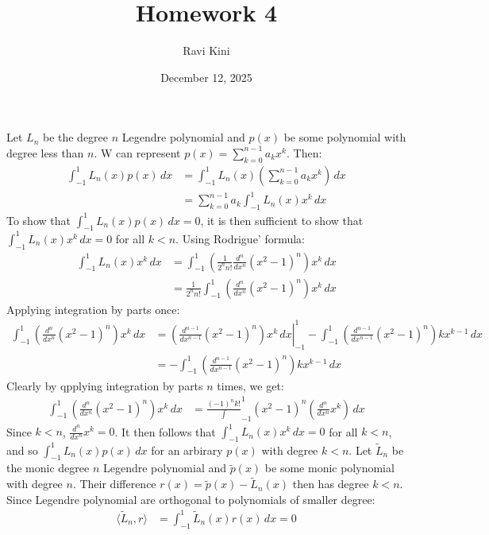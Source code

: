 \documentclass{article}
\title{Homework 4}
\author{Ravi Kini}
\date{December 12, 2025}
\begin{document}
\maketitle

\problem{}
Let $L_n$ be the degree $n$ Legendre polynomial and $p(x)$ be some polynomial with degree less than $n$. W can represent $p(x) = \sum_{k=0}^{n-1} a_k x^k$. Then:
\begin{align*}
    \int_{-1}^1 L_n(x)p(x) \, dx & = \int_{-1}^1 L_n(x)\left(\sum_{k=0}^{n-1} a_k x^k\right) \, dx \\
    & = \sum_{k=0}^{n-1} a_k\int_{-1}^1 L_n(x)x^k \, dx
\end{align*}
To show that $\int_{-1}^1 L_n(x)p(x) \, dx = 0$, it is then sufficient to show that $\int_{-1}^1 L_n(x)x^k \, dx = 0$ for all $k < n$. Using Rodrigue' formula:
\begin{align*}
    \int_{-1}^1 L_n(x)x^k \, dx & = \int_{-1}^1 \left(\frac{1}{2^n n!}\frac{d^n}{dx^n} {(x^2 - 1)}^n\right) x^k \, dx \\
    & = \frac{1}{2^n n!}\int_{-1}^1 \left(\frac{d^n}{dx^n} {(x^2 - 1)}^n\right) x^k \, dx
\end{align*}
Applying integration by parts once:
\begin{align*}
    \int_{-1}^1 \left(\frac{d^n}{dx^n} {(x^2 - 1)}^n\right) x^k \, dx & = \left.\left(\frac{d^{n-1}}{dx^{n-1}} {(x^2 - 1)}^n\right) x^k \, dx \right\vert_{-1}^1 - \int_{-1}^1 \left(\frac{d^{n-1}}{dx^{n-1}} {(x^2 - 1)}^n\right) kx^{k-1} \, dx \\
    & = -\int_{-1}^1 \left(\frac{d^{n-1}}{dx^{n-1}} {(x^2 - 1)}^n\right) kx^{k-1} \, dx
\end{align*}
Clearly by qpplying integration by parts $n$ times, we get:
\begin{align*}
    \int_{-1}^1 \left(\frac{d^n}{dx^n} {(x^2 - 1)}^n\right) x^k \, dx & = \frac{{(-1)}^n k!}\int_{-1}^1 {(x^2 - 1)}^n \left(\frac{d^n}{dx^n}x^k\right) \, dx
\end{align*}
Since $k < n$, $\frac{d^n}{dx^n}x^k = 0$. It then follows that $\int_{-1}^1 L_n(x)x^k \, dx = 0$ for all $k < n$, and so $\int_{-1}^1 L_n(x)p(x) \, dx$ for an arbirary $p(x)$ with degree $k < n$.
Let $\tilde{L}_n$ be the monic degree $n$ Legendre polynomial and $\tilde{p}(x)$ be some monic polynomial with degree $n$. Their difference $r(x) = \tilde{p}(x) - \tilde{L}_n(x)$ then has degree $k < n$. Since Legendre polynomial are orthogonal to polynomials of smaller degree:
\begin{align*}
    \langle \tilde{L}_n, r\rangle & = \int_{-1}^1 \tilde{L}_n(x)r(x) \, dx = 0
\end{align*}
\end{document}

